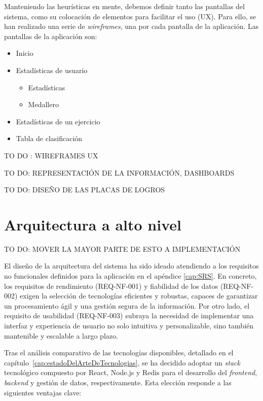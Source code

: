 Manteniendo las heurísticas en mente, debemos definir tanto las pantallas del sistema, como su colocación de elementos para facilitar el uso (UX). Para ello, se han realizado una serie de \textit{wireframes}, una por cada pantalla de la aplicación. Las pantallas de la aplicación son:
\begin{itemize}
    \item Inicio
    \item Estadísticas de usuario
    \begin{itemize}
        \item Estadísticas
        \item Medallero
    \end{itemize}
    \item Estadísticas de un ejercicio
    \item Tabla de clasificación
\end{itemize}

TO DO : WIREFRAMES UX

TO DO: REPRESENTACIÓN DE LA INFORMACIÓN, DASHBOARDS

TO DO: DISEÑO DE LAS PLACAS DE LOGROS

\section{Arquitectura a alto nivel}

TO DO: MOVER LA MAYOR PARTE DE ESTO A IMPLEMENTACIÓN

El diseño de la arquitectura del sistema ha sido ideado atendiendo a los requisitos no funcionales definidos para la aplicación en el apéndice \ref{cap:SRS}. En concreto, los requisitos de rendimiento (REQ-NF-001) y fiabilidad de los datos (REQ-NF-002) exigen la selección de tecnologías eficientes y robustas, capaces de garantizar un procesamiento ágil y una gestión segura de la información. Por otro lado, el requisito de usabilidad (REQ-NF-003) subraya la necesidad de implementar una interfaz y experiencia de usuario no solo intuitiva y personalizable, sino también mantenible y escalable a largo plazo.

Tras el análisis comparativo de las tecnologías disponibles, detallado en el capítulo~\ref{cap:estadoDelArteDeTecnologias}, se ha decidido adoptar un \textit{stack} tecnológico compuesto por React, Node.js y Redis para el desarrollo del \textit{frontend}, \textit{backend} y gestión de datos, respectivamente. Esta elección responde a las siguientes ventajas clave:

